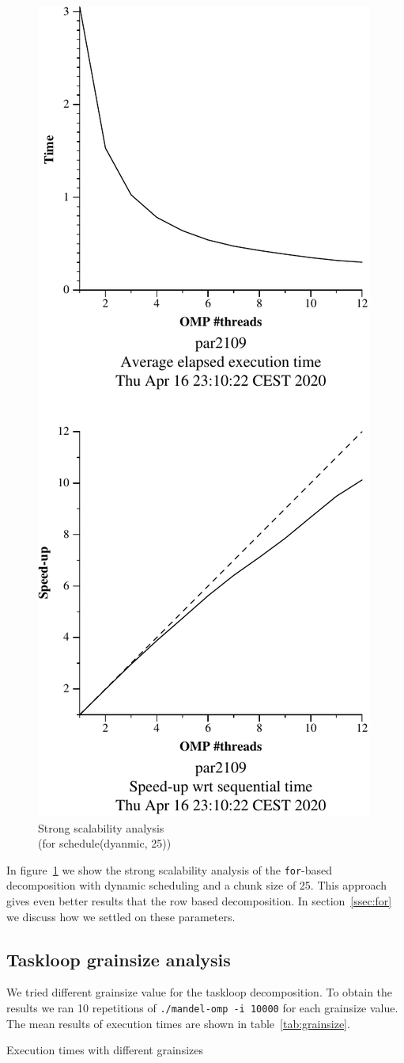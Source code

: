 \begin{figure}[H]
    \centering
    \includegraphics[width=0.35\linewidth]{plots/v11-crop.pdf}
    \caption{Strong scalability analysis \\ (for schedule(dyanmic, 25))}
    \label{fig:ssa_v11} 
\end{figure}

In figure~\ref{fig:ssa_v11} we show the strong scalability analysis of the \texttt{for}-based decomposition
with dynamic scheduling and a chunk size of 25. This approach gives even better results that the row based
decomposition. In section~\ref{ssec:for} we discuss how we settled on these parameters.

\pagebreak
\subsection{Taskloop grainsize analysis}

We tried different grainsize value for the taskloop decomposition. To obtain the results we ran
10 repetitions of \texttt{./mandel-omp -i 10000} for each grainsize value. The mean results of
execution times are shown in table~\ref{tab:grainsize}.

\begin{table}[H]
    \caption{Execution times with different grainsizes}%
    \label{tab:grainsize}
    \begin{center}
    
    \end{center}
\end{table}

